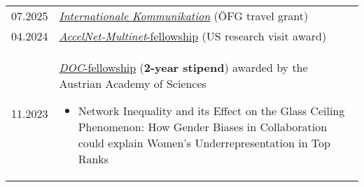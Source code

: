 
\begin{longtable}[l]{@{}p{} p{}}
    07.2025 & \href{https://www.oefg.at/foerderungen/internationale-kommunikation/}{\emph{Internationale Kommunikation}} (\"OFG travel grant)\\
    04.2024 & \href{https://www.accelnet-multinet.org/}{\emph{AccelNet-Multinet}-fellowship} (US research visit award)\\
    11.2023 & \href{https://stipendien.oeaw.ac.at/en/fellowships/doc}{\emph{DOC}-fellowship} (\textbf{2-year stipend}) awarded by the Austrian Academy of Sciences
    \begin{itemize}
        \item \raggedright Network Inequality and its Effect on the Glass Ceiling Phenomenon: How Gender Biases in Collaboration could explain Women’s Underrepresentation in Top Ranks
    \end{itemize}

\end{longtable}
